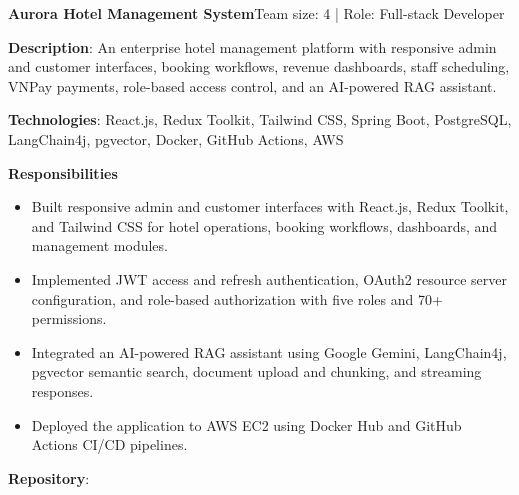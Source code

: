   \resumeProjectHeading
    {\textbf{Aurora Hotel Management System}}{Team size: 4 | Role: Full-stack Developer}
    \resumeItemListStart
      \item \textbf{Description}: An enterprise hotel management platform with responsive admin and customer interfaces, booking workflows, revenue dashboards, staff scheduling, VNPay payments, role-based access control, and an AI-powered RAG assistant.
      \item \textbf{Technologies}: React.js, Redux Toolkit, Tailwind CSS, Spring Boot, PostgreSQL, LangChain4j, pgvector, Docker, GitHub Actions, AWS
      \item \textbf{Responsibilities}
        \begin{itemize}
          \item Built responsive admin and customer interfaces with React.js, Redux Toolkit, and Tailwind CSS for hotel operations, booking workflows, dashboards, and management modules.
          \item Implemented JWT access and refresh authentication, OAuth2 resource server configuration, and role-based authorization with five roles and 70+ permissions.
          \item Integrated an AI-powered RAG assistant using Google Gemini, LangChain4j, pgvector semantic search, document upload and chunking, and streaming responses.
          \item Deployed the application to AWS EC2 using Docker Hub and GitHub Actions CI/CD pipelines.
        \end{itemize}
      \item \textbf{Repository}: \href{https://github.com/nvminh162/aurora-hotel-management-system}{}
    \resumeItemListEnd

\resumeSubHeadingListEnd
